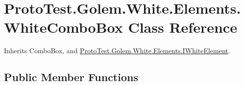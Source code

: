 \hypertarget{class_proto_test_1_1_golem_1_1_white_1_1_elements_1_1_white_combo_box}{\section{Proto\-Test.\-Golem.\-White.\-Elements.\-White\-Combo\-Box Class Reference}
\label{class_proto_test_1_1_golem_1_1_white_1_1_elements_1_1_white_combo_box}
}


Inherits Combo\-Box, and \hyperlink{interface_proto_test_1_1_golem_1_1_white_1_1_elements_1_1_i_white_element}{Proto\-Test.\-Golem.\-White.\-Elements.\-I\-White\-Element}.

\subsection*{Public Member Functions}
